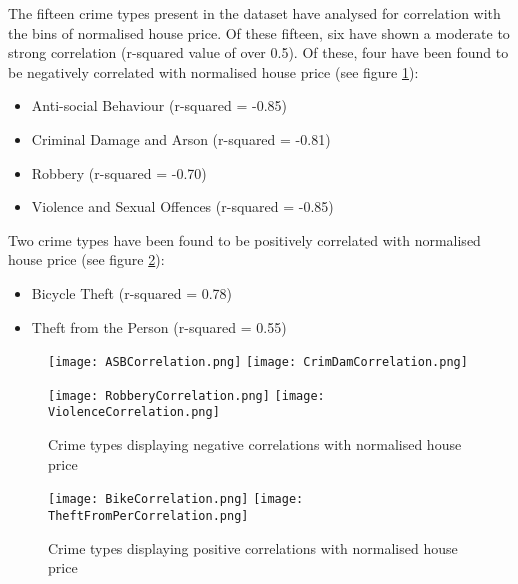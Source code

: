 \documentclass{article}
\begin{document}
The fifteen crime types present in the dataset have analysed for correlation with the bins of normalised house price. Of these fifteen, six have shown a moderate to strong correlation (r-squared value of over 0.5). Of these, four have been found to be negatively correlated with normalised house price (see figure \ref{fig:NegCorr}):
\begin{itemize}
\item Anti-social Behaviour (r-squared = -0.85)
\item Criminal Damage and Arson (r-squared = -0.81)
\item Robbery (r-squared = -0.70)
\item Violence and Sexual Offences (r-squared = -0.85)
\end{itemize}
\bigskip

Two crime types have been found to be positively correlated with normalised house price (see figure \ref{fig:PosCorr}):
\begin{itemize}
\item Bicycle Theft (r-squared = 0.78)
\item Theft from the Person (r-squared = 0.55)
\end{itemize}




\begin{figure}[H]
\ffigbox
{%
  \begin{subfloatrow}[2]
  {\texttt{[image: ASBCorrelation.png]}}\hskip10pt%
  {\texttt{[image: CrimDamCorrelation.png]}}
  \end{subfloatrow}\vskip10pt%
  \begin{subfloatrow}[2]
  {\texttt{[image: RobberyCorrelation.png]}}\hskip10pt%
  {\texttt{[image: ViolenceCorrelation.png]}}
  \end{subfloatrow}%
}
{\caption{Crime types displaying negative correlations with normalised house price}\label{fig:NegCorr}}
\end{figure}

\begin{figure}[H]
\ffigbox
{%
  \begin{subfloatrow}[2]
  {\texttt{[image: BikeCorrelation.png]}}\hskip10pt%
  {\texttt{[image: TheftFromPerCorrelation.png]}}
  \end{subfloatrow}%
}
{\caption{Crime types displaying positive correlations with normalised house price}\label{fig:PosCorr}}
\end{figure}
\end{document}
